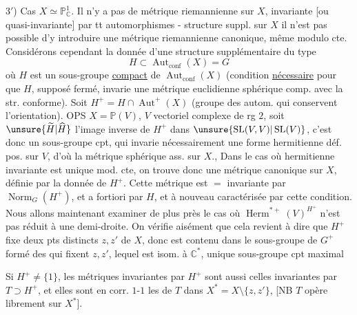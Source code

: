 $3'$) Cas $X\simeq\mathbb P^1_{\mathbb C}$. Il n'y a pas de métrique riemannienne sur $X$, invariante [ou quasi-invariante] par tt automorphismes -  structure suppl. sur $X$
il n'est pas possible d'y introduire une métrique riemannienne canonique, même modulo cte. Considérons cependant la donnée d'une structure supplémentaire du type
\[
H\subset\operatorname{Aut}_{\mathrm{conf}}(X)=G
\]
où $H$ est un sous-groupe \uline{compact} de $\operatorname{Aut}_{\mathrm{conf}}(X)$ (condition \uline{nécessaire} pour que $H$, supposé fermé, invarie une métrique euclidienne sphérique comp. avec la str. conforme). Soit $H^+=H\cap\operatorname{Aut}^+(X)$ (groupe des autom. qui conservent l'orientation). OPS $X=\mathbb P(V)$, $V$ vectoriel complexe de rg $2$,  soit $\unsure{\widetilde H|\widehat H}$ l'image inverse de $H^+$ dans $\unsure{\operatorname{SL}(V,V)|\operatorname{SL}(V)}$, c'est donc un sous-groupe cpt, qui invarie nécessairement une forme hermitienne déf. pos. sur $V$, d'où la métrique sphérique ass. sur $X$., Dans le cas où  hermitienne invariante est unique mod. cte, on trouve donc une métrique canonique sur $X$, définie par la donnée de $H^+$. Cette métrique est $=$ invariante par $\operatorname{Norm}_G(H^+)$, et a fortiori par $H$, et à nouveau caractérisée par cette condition.
Nous allons maintenant examiner de plus près le cas où  $\operatorname{Herm}^{*+}(V)^{H^+}$ n'est pas réduit à une demi-droite. On vérifie aisément que cela revient à dire que $H^+$  fixe deux pts distincts $z,z'$ de $X$, donc est contenu dans le sous-groupe de $G^+$  formé des  qui fixent $z,z'$, lequel est isom. à $\mathbb C^*$,  unique sous-groupe cpt maximal 

Si $H^+\ne\{1\}$, les métriques invariantes par $H^+$ sont aussi celles invariantes par $T\supset H^+$,
et elles sont en corr. $1$-$1$  les  de $T$ dans $X^*=X\setminus\{z,z'\}$, [NB $T$ opère librement sur $X^*$].

